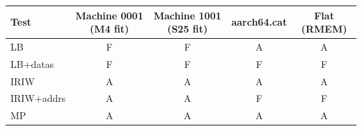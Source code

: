\begin{tabular}{lcccc}
\toprule
Test & Machine 0001 (M4 fit) & Machine 1001 (S25 fit) & aarch64.cat & Flat (RMEM) \\
\midrule
LB & F & F & A & A \\
LB+datas & F & F & F & F \\
IRIW & A & A & A & A \\
IRIW+addrs & A & A & F & F \\
MP & A & A & A & A \\
\bottomrule
\end{tabular}
